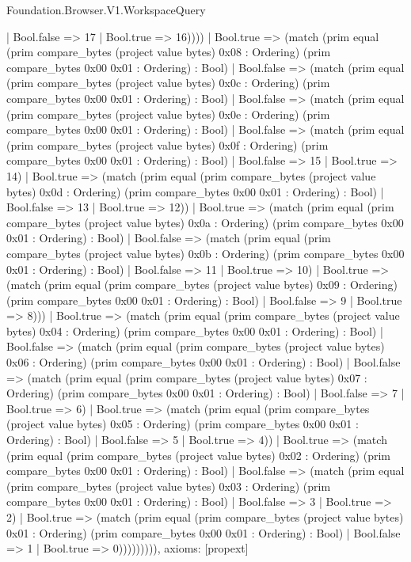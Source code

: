 \begin{lexlean}{Foundation.Browser.V1.WorkspaceQuery}
\begin{semanticmodule}
{                    | Bool.false => 17
                    | Bool.true => 16))))
            | Bool.true => (match (prim equal (prim compare_bytes (project value bytes) 0x08 : Ordering) (prim compare_bytes 0x00 0x01 : Ordering) : Bool)
              | Bool.false => (match (prim equal (prim compare_bytes (project value bytes) 0x0c : Ordering) (prim compare_bytes 0x00 0x01 : Ordering) : Bool)
                | Bool.false => (match (prim equal (prim compare_bytes (project value bytes) 0x0e : Ordering) (prim compare_bytes 0x00 0x01 : Ordering) : Bool)
                  | Bool.false => (match (prim equal (prim compare_bytes (project value bytes) 0x0f : Ordering) (prim compare_bytes 0x00 0x01 : Ordering) : Bool)
                    | Bool.false => 15
                    | Bool.true => 14)
                  | Bool.true => (match (prim equal (prim compare_bytes (project value bytes) 0x0d : Ordering) (prim compare_bytes 0x00 0x01 : Ordering) : Bool)
                    | Bool.false => 13
                    | Bool.true => 12))
                | Bool.true => (match (prim equal (prim compare_bytes (project value bytes) 0x0a : Ordering) (prim compare_bytes 0x00 0x01 : Ordering) : Bool)
                  | Bool.false => (match (prim equal (prim compare_bytes (project value bytes) 0x0b : Ordering) (prim compare_bytes 0x00 0x01 : Ordering) : Bool)
                    | Bool.false => 11
                    | Bool.true => 10)
                  | Bool.true => (match (prim equal (prim compare_bytes (project value bytes) 0x09 : Ordering) (prim compare_bytes 0x00 0x01 : Ordering) : Bool)
                    | Bool.false => 9
                    | Bool.true => 8)))
              | Bool.true => (match (prim equal (prim compare_bytes (project value bytes) 0x04 : Ordering) (prim compare_bytes 0x00 0x01 : Ordering) : Bool)
                | Bool.false => (match (prim equal (prim compare_bytes (project value bytes) 0x06 : Ordering) (prim compare_bytes 0x00 0x01 : Ordering) : Bool)
                  | Bool.false => (match (prim equal (prim compare_bytes (project value bytes) 0x07 : Ordering) (prim compare_bytes 0x00 0x01 : Ordering) : Bool)
                    | Bool.false => 7
                    | Bool.true => 6)
                  | Bool.true => (match (prim equal (prim compare_bytes (project value bytes) 0x05 : Ordering) (prim compare_bytes 0x00 0x01 : Ordering) : Bool)
                    | Bool.false => 5
                    | Bool.true => 4))
                | Bool.true => (match (prim equal (prim compare_bytes (project value bytes) 0x02 : Ordering) (prim compare_bytes 0x00 0x01 : Ordering) : Bool)
                  | Bool.false => (match (prim equal (prim compare_bytes (project value bytes) 0x03 : Ordering) (prim compare_bytes 0x00 0x01 : Ordering) : Bool)
                    | Bool.false => 3
                    | Bool.true => 2)
                  | Bool.true => (match (prim equal (prim compare_bytes (project value bytes) 0x01 : Ordering) (prim compare_bytes 0x00 0x01 : Ordering) : Bool)
                    | Bool.false => 1
                    | Bool.true => 0))))))))),
  axioms: [propext]
}


\end{semanticmodule}
\end{lexlean}

